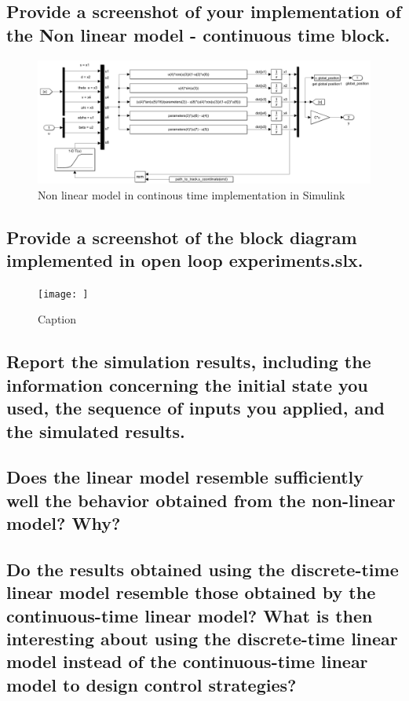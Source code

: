 \subsection{Provide a screenshot of your implementation of the Non linear model - continuous time block.}

\begin{figure}[H]
    \centering
    \includegraphics[width = 0.9\linewidth]{Latex report/image/nonLinModelContinousTime.png}
    \caption{Non linear model in continous time implementation in Simulink}
    \label{fig:continousTimeSimulink}
\end{figure}




\subsection{Provide a screenshot of the block diagram implemented in open loop experiments.slx.}
\begin{figure}
    \centering
    \texttt{[image: ]}
    \caption{Caption}
    \label{fig:my_label}
\end{figure}





\subsection{Report the simulation results, including the information concerning the initial state you used, the sequence of inputs you applied, and the simulated results.}




\subsection{Does the linear model resemble sufficiently well the behavior obtained from the non-linear model? Why?}




\subsection{Do the results obtained using the discrete-time linear model resemble those obtained by the continuous-time linear model? What is then interesting about using the discrete-time linear model instead of the continuous-time linear model to design control strategies?}



